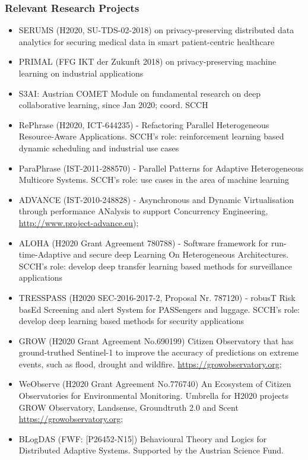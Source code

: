\documentclass[a4paper,11pt]{article}
\begin{document}
\subsubsection*{Relevant Research Projects}

\begin{itemize}
\item SERUMS (H2020, SU-TDS-02-2018) on privacy-preserving distributed data analytics for securing medical data in smart patient-centric healthcare 

\item PRIMAL (FFG IKT der Zukunft 2018) on privacy-preserving machine learning on industrial applications

\item S3AI: Austrian COMET Module on fundamental research on deep collaborative learning, since Jan 2020; coord. SCCH 

\item RePhrase (H2020, ICT-644235) - Refactoring Parallel Heterogeneous Resource-Aware Applications. SCCH's role: reinforcement learning based dynamic scheduling and industrial use cases

\item ParaPhrase (IST-2011-288570) - Parallel Patterns for Adaptive Heterogeneous Multicore Systems. SCCH's role: use cases in the area of machine learning

\item ADVANCE (IST-2010-248828) - Asynchronous and Dynamic Virtualisation through performance ANalysis to support Concurrency Engineering, \url{http://www.project-advance.eu});

\item ALOHA (H2020 Grant Agreement 780788) - Software framework for run-time-Adaptive and secure deep Learning On Heterogeneous Architectures. SCCH's role: develop deep transfer learning based methods for surveillance applications

\item TRESSPASS (H2020 SEC-2016-2017-2, Proposal Nr. 787120) - robusT Risk basEd Screening and alert System for PASSengers and luggage. SCCH's role: develop deep learning based methods for security applications

\item GROW (H2020 Grant Agreement No.690199) Citizen Observatory that has ground-truthed Sentinel-1 to improve the accuracy of predictions on extreme events, such as flood, drought and wildfire. \url{https://growobservatory.org};

\item WeObserve (H2020 Grant Agreement No.776740) An Ecosystem of Citizen Observatories for Environmental Monitoring. Umbrella for H2020 projects GROW Observatory, Landsense, Groundtruth 2.0 and Scent \url{https://growobservatory.org};

\item BLogDAS (FWF: [P26452-N15]) Behavioural Theory and Logics for Distributed Adaptive Systems. Supported by the Austrian Science Fund.

\end{itemize}
\end{document}
